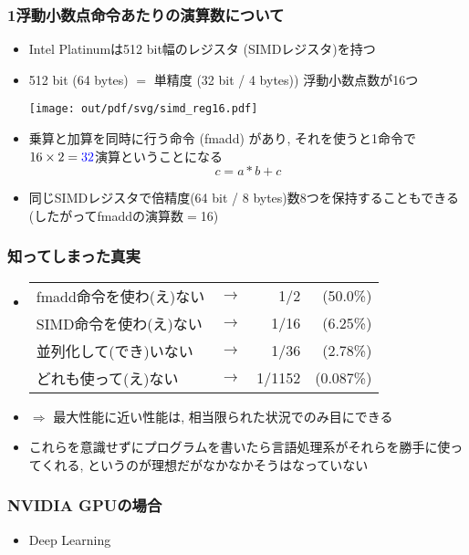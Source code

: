 \documentclass[10pt,dvipdfmx]{beamer}
\newcommand{\ao}[1]{{\color{blue}#1}}
\newcommand{\aka}[1]{{\color{red}#1}}
\begin{document}
\begin{frame}
  \frametitle{1浮動小数点命令あたりの演算数について}
  \begin{itemize}
  \item<1-> Intel Platinumは\ao{512 bit}幅のレジスタ (\ao{SIMDレジスタ})を持つ
    
  \item<2-> 512 bit (64 bytes) $=$ 単精度 (32 bit / 4 bytes))
    浮動小数点数が\ao{16つ}
    \begin{center}
    \texttt{[image: out/pdf/svg/simd\_reg16.pdf]}
    \end{center}

  \item<3-> 乗算と加算を同時に行う命令 (fmadd) があり,
    それを使うと1命令で$16 \times 2 = \ao{32}$演算ということになる
    \[ c = a * b + c \]

  \item<4->
    同じ\ao{SIMDレジスタ}で倍精度(64 bit / 8 bytes)数8つを保持することもできる
    (したがってfmaddの演算数$=$16)
  \end{itemize}
\end{frame}

\begin{frame}
  \frametitle{知ってしまった真実}
  \begin{itemize}
  \item[]
    \begin{tabular}{llrr}
    fmadd命令を使わ(え)ない  & $\rightarrow$ & \aka{1/2} & \aka{(50.0\%)} \\
      SIMD命令を使わ(え)ない & $\rightarrow$ & \aka{1/16} & \aka{(6.25\%)} \\
      並列化して(でき)いない & $\rightarrow$ & \aka{1/36} & \aka{(2.78\%)} \\
      どれも使って(え)ない   & $\rightarrow$ & \aka{1/1152} & \aka{(0.087\%)}
    \end{tabular}
  \item $\Rightarrow$ 最大性能に近い性能は, 相当限られた状況でのみ目にできる
  \item これらを意識せずにプログラムを書いたら言語処理系がそれらを勝手に使ってくれる,
    というのが理想だがなかなかそうはなっていない
  \end{itemize}
\end{frame}

\iffalse
\begin{frame}
  \frametitle{NVIDIA GPUの場合}
  \begin{itemize}
  \item Deep Learning
  \end{itemize}
\end{frame}
\end{document}
